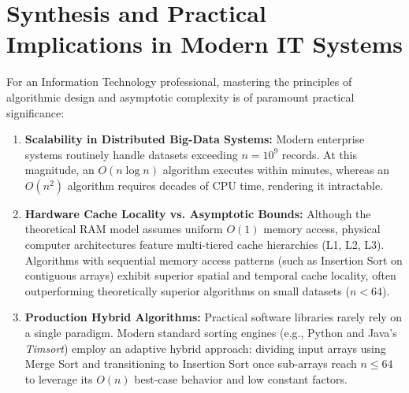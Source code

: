 \documentclass[10pt,a4paper]{article}
\theoremstyle{definition}
\begin{document}
\section{Synthesis and Practical Implications in Modern IT Systems}
For an Information Technology professional, mastering the principles of algorithmic design and asymptotic complexity is of paramount practical significance:
\begin{enumerate}[leftmargin=*,itemsep=2pt,topsep=2pt]
    \item \textbf{Scalability in Distributed Big-Data Systems:} Modern enterprise systems routinely handle datasets exceeding $n = 10^9$ records. At this magnitude, an $O(n \log n)$ algorithm executes within minutes, whereas an $O(n^2)$ algorithm requires decades of CPU time, rendering it intractable.
    \item \textbf{Hardware Cache Locality vs. Asymptotic Bounds:} Although the theoretical RAM model assumes uniform $O(1)$ memory access, physical computer architectures feature multi-tiered cache hierarchies (L1, L2, L3). Algorithms with sequential memory access patterns (such as Insertion Sort on contiguous arrays) exhibit superior spatial and temporal cache locality, often outperforming theoretically superior algorithms on small datasets ($n < 64$).
    \item \textbf{Production Hybrid Algorithms:} Practical software libraries rarely rely on a single paradigm. Modern standard sorting engines (e.g., Python and Java's \textit{Timsort}) employ an adaptive hybrid approach: dividing input arrays using Merge Sort and transitioning to Insertion Sort once sub-arrays reach $n \le 64$ to leverage its $O(n)$ best-case behavior and low constant factors.
\end{enumerate}

\end{document}
